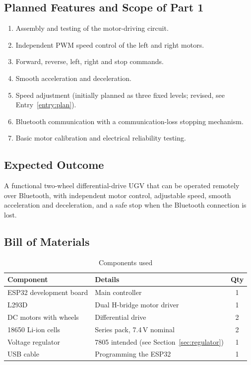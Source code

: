 \documentclass[11pt]{article}
\begin{document}
\subsection{Planned Features and Scope of Part 1}
\begin{enumerate}
    \item Assembly and testing of the motor-driving circuit.
    \item Independent PWM speed control of the left and right motors.
    \item Forward, reverse, left, right and stop commands.
    \item Smooth acceleration and deceleration.
    \item Speed adjustment (initially planned as three fixed levels; revised, see Entry~\ref{entry:plan}).
    \item Bluetooth communication with a communication-loss stopping mechanism.
    \item Basic motor calibration and electrical reliability testing.
\end{enumerate}

\subsection{Expected Outcome}
A functional two-wheel differential-drive UGV that can be operated remotely over Bluetooth, with independent motor control, adjustable speed, smooth acceleration and deceleration, and a safe stop when the Bluetooth connection is lost.

\subsection{Bill of Materials}
\begin{table}[H]
\centering
\caption{Components used}
\label{tab:bom}
\begin{tabular}{@{}llc@{}}
\toprule
\textbf{Component} & \textbf{Details} & \textbf{Qty} \\
\midrule
ESP32 development board & Main controller & 1 \\
L293D & Dual H-bridge motor driver & 1 \\
DC motors with wheels & Differential drive & 2 \\
18650 Li-ion cells & Series pack, 7.4\,V nominal & 2 \\
Voltage regulator & 7805 intended (see Section~\ref{sec:regulator}) & 1 \\
USB cable & Programming the ESP32 & 1 \\
\bottomrule
\end{tabular}
\end{table}
\end{document}
